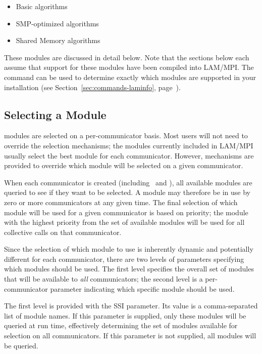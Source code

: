 \begin{itemize}
\item Basic algorithms
\item SMP-optimized algorithms
\item Shared Memory algorithms
\end{itemize}

These modules are discussed in detail below.  Note that the sections
below each assume that support for these modules have been compiled
into LAM/MPI.  The  command can be used to determine
exactly which modules are supported in your installation (see
Section~\ref{sec:commands-laminfo},
page~\pageref{sec:commands-laminfo}).


\subsection{Selecting a  Module}
\label{sec:mpi-ssi-coll-select}

 modules are selected on a per-communicator basis.  Most
users will not need to override the  selection mechanisms;
the  modules currently included in LAM/MPI usually select
the best module for each communicator.  However, mechanisms are
provided to override which  module will be selected on a
given communicator.

When each communicator is created (including \mcw\ and \mcs), all
available  modules are queried to see if they want to be
selected.  A  module may therefore be in use by zero or
more communicators at any given time.  The final selection of which
module will be used for a given communicator is based on priority; the
module with the highest priority from the set of available modules
will be used for all collective calls on that communicator.

Since the selection of which module to use is inherently dynamic and
potentially different for each communicator, there are two levels of
parameters specifying which modules should be used.  The first level
specifies the overall set of  modules that will be
available to {\em all} communicators; the second level is a
per-communicator parameter indicating which specific module should be
used.

The first level is provided with the  SSI parameter.
Its value is a comma-separated list of  module names.  If
this parameter is supplied, only these modules will be queried at run
time, effectively determining the set of modules available for
selection on all communicators.  If this parameter is not supplied,
all  modules will be queried.

